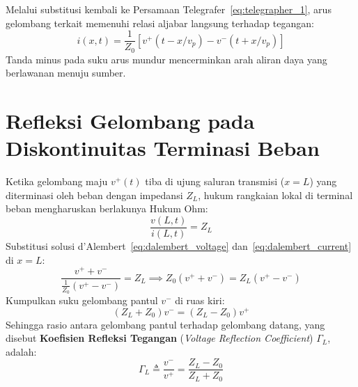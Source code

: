 \documentclass[11pt,a4paper]{article}
\theoremstyle{definition}
\begin{document}
Melalui substitusi kembali ke Persamaan Telegrafer~\eqref{eq:telegrapher_1}, arus gelombang terkait memenuhi relasi aljabar langsung terhadap tegangan:
\begin{equation}
    i(x, t) = \frac{1}{Z_0} \left[ v^+(t - x/v_p) - v^-(t + x/v_p) \right]
    \label{eq:dalembert_current}
\end{equation}
Tanda minus pada suku arus mundur mencerminkan arah aliran daya yang berlawanan menuju sumber.

\section{Refleksi Gelombang pada Diskontinuitas Terminasi Beban}

Ketika gelombang maju $v^+(t)$ tiba di ujung saluran transmisi ($x = L$) yang diterminasi oleh beban dengan impedansi $Z_L$, hukum rangkaian lokal di terminal beban mengharuskan berlakunya Hukum Ohm:
\begin{equation}
    \frac{v(L, t)}{i(L, t)} = Z_L
    \label{eq:load_ohm_law}
\end{equation}
Substitusi solusi d'Alembert~\eqref{eq:dalembert_voltage} dan~\eqref{eq:dalembert_current} di $x = L$:
\begin{equation}
    \frac{v^+ + v^-}{\frac{1}{Z_0}(v^+ - v^-)} = Z_L \implies Z_0 (v^+ + v^-) = Z_L (v^+ - v^-)
\end{equation}
Kumpulkan suku gelombang pantul $v^-$ di ruas kiri:
\begin{equation}
    (Z_L + Z_0) v^- = (Z_L - Z_0) v^+
\end{equation}
Sehingga rasio antara gelombang pantul terhadap gelombang datang, yang disebut \textbf{Koefisien Refleksi Tegangan} (\textit{Voltage Reflection Coefficient}) $\Gamma_L$, adalah:
\begin{equation}
    \Gamma_L \triangleq \frac{v^-}{v^+} = \frac{Z_L - Z_0}{Z_L + Z_0}
    \label{eq:reflection_coefficient}
\end{equation}
\end{document}
